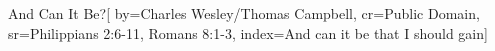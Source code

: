 {And Can It Be?}[
    by={Charles Wesley/Thomas Campbell},
    cr={Public Domain},
    sr={Philippians 2:6-11, Romans 8:1-3},
    index={And can it be that I should gain}]
